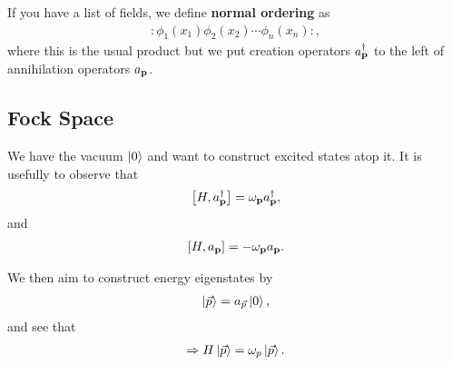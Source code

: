 \begin{definition}
    If you have a list of fields, we define \textbf{normal ordering} as
    \begin{align}
        :\phi_1 \left( x_1 \right) \phi_2 \left( x_2 \right) \cdots \phi_{n}\left( x_{n} \right) :
    ,\end{align}
    where this is the usual product but we put creation operators $a^{\dag}_{\vb{p}}$ to the left of annihilation operators $a_{\vb{p}}$.
\end{definition}

\subsection{Fock Space}

We have the vacuum $\ket{0}$ and want to construct excited states atop it. It is usefully to observe that
\begin{align}
    \left[ H, a^{\dag}_{\vb{p}} \right] = \omega_{\vb{p}} a_{\vb{p}}^{\dag}
,\end{align}
and
\begin{align}
    \left[ H, a_{\vb{p}} \right] = - \omega_{\vb{p}} a_{\vb{p}}
.\end{align}

We then aim to construct energy eigenstates by
\begin{align}
    \ket{\vec{p}} = a_{\vec{p}} \ket{0}
,\end{align}
and see that
\begin{align}
    \Rightarrow H \ket{\vec{p}} = \omega_{p} \ket{\vec{p}}
.\end{align}
